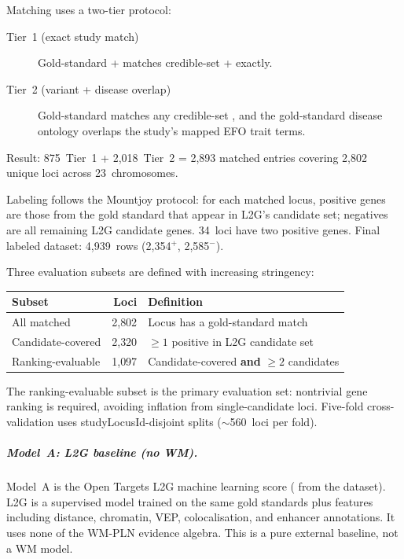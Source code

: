 \documentclass[11pt,openany]{report}
\begin{document}
Matching uses a two-tier protocol:
\begin{description}
\item[Tier~1 (exact study match)]
  Gold-standard  +  matches
  credible-set  +  exactly.
\item[Tier~2 (variant + disease overlap)]
  Gold-standard  matches any credible-set
  , and the gold-standard disease ontology
  overlaps the study's mapped EFO trait terms.
\end{description}
\noindent
Result: 875~Tier~1 + 2,018~Tier~2 = 2,893 matched entries
covering 2,802 unique loci across 23~chromosomes.

Labeling follows the Mountjoy protocol: for each matched locus,
positive genes are those from the gold standard that appear
in L2G's candidate set; negatives are all remaining L2G
candidate genes.  34~loci have two positive genes.
Final labeled dataset: 4,939~rows (2,354$^+$, 2,585$^-$).

Three evaluation subsets are defined with increasing stringency:
\begin{center}
\small
\begin{tabular}{@{}lrl@{}}
\toprule
\textbf{Subset} & \textbf{Loci} & \textbf{Definition} \\
\midrule
All matched         & 2{,}802 & Locus has a gold-standard match \\
Candidate-covered   & 2{,}320 & $\geq 1$ positive in L2G candidate set \\
Ranking-evaluable   & 1{,}097 & Candidate-covered \textbf{and} $\geq 2$ candidates \\
\bottomrule
\end{tabular}
\end{center}
\noindent
The ranking-evaluable subset is the primary evaluation set:
nontrivial gene ranking is required, avoiding inflation from
single-candidate loci.  Five-fold cross-validation uses
studyLocusId-disjoint splits ($\sim$560~loci per fold).

\subparagraph{Model~A: L2G baseline (no WM).}
Model~A is the Open Targets L2G machine learning score
( from the  dataset).
L2G is a supervised model trained on the same gold standards
plus features including distance, chromatin, VEP, colocalisation,
and enhancer annotations.  It uses none of the WM-PLN evidence
algebra.  This is a pure external baseline, not a WM model.
\end{document}
